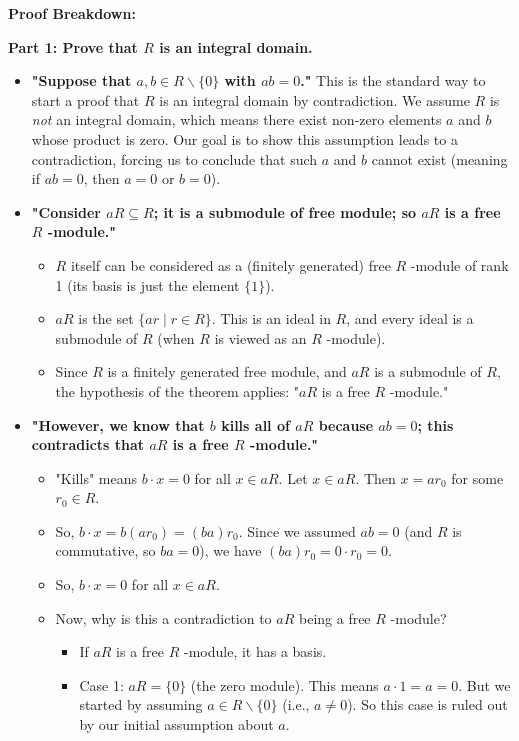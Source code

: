\textbf{Proof Breakdown:}

\textbf{Part 1: Prove that $R$ is an integral domain.}

\begin{itemize}
	\item \textbf{"Suppose that $a, b \in R \backslash\{0\}$ with $a b=0$."}
This is the standard way to start a proof that $R$ is an integral domain by contradiction. We assume $R$ is \textit{not} an integral domain, which means there exist non-zero elements $a$ and $b$ whose product is zero. Our goal is to show this assumption leads to a contradiction, forcing us to conclude that such $a$ and $b$ cannot exist (meaning if $ab=0$, then $a=0$ or $b=0$).
	\item \textbf{"Consider $a R \subseteq R$; it is a submodule of free module; so $a R$ is a free $R$ -module."}
	\begin{itemize}
		\item $R$ itself can be considered as a (finitely generated) free $R$ -module of rank 1 (its basis is just the element $\{1\}$).
		\item $aR$ is the set $\{ar \mid r \in R\}$. This is an ideal in $R$, and every ideal is a submodule of $R$ (when $R$ is viewed as an $R$ -module).
		\item Since $R$ is a finitely generated free module, and $aR$ is a submodule of $R$, the hypothesis of the theorem applies: "$aR$ is a free $R$ -module."
	\end{itemize}
	\item \textbf{"However, we know that $b$ kills all of $a R$ because $a b=0$; this contradicts that $a R$ is a free $R$ -module."}
	\begin{itemize}
		\item "Kills" means $b \cdot x = 0$ for all $x \in aR$. Let $x \in aR$. Then $x = ar_0$ for some $r_0 \in R$.
		\item So, $b \cdot x = b(ar_0) = (ba)r_0$. Since we assumed $ab=0$ (and $R$ is commutative, so $ba=0$), we have $(ba)r_0 = 0 \cdot r_0 = 0$.
		\item So, $b \cdot x = 0$ for all $x \in aR$.
		\item Now, why is this a contradiction to $aR$ being a free $R$ -module?
		\begin{itemize}
			\item If $aR$ is a free $R$ -module, it has a basis.
			\item Case 1: $aR = \{0\}$ (the zero module). This means $a \cdot 1 = a = 0$. But we started by assuming $a \in R \backslash\{0\}$ (i.e., $a \neq 0$). So this case is ruled out by our initial assumption about $a$.

\end{itemize}
\end{itemize}
\end{itemize}
